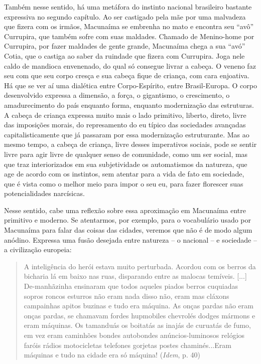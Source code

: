 Também nesse sentido, há uma metáfora do instinto nacional brasileiro
bastante expressiva no segundo capítulo. Ao ser castigado pela mãe por
uma malvadeza que fizera com os irmãos, Macunaíma se embrenha no mato e
encontra seu ``avô'' Currupira, que também sofre com suas maldades.
Chamado de Menino-home por Currupira, por fazer maldades de gente
grande, Macunaíma chega a sua ``avó'' Cotia, que o castiga ao saber da
ruindade que fizera com Currupira. Joga nele caldo de mandioca
envenenado, do qual só consegue livrar a cabeça. O veneno faz seu com
que seu corpo cresça e sua cabeça fique de criança, com cara enjoativa.
Há que se ver aí uma dialética entre Corpo-Espírito, entre
Brasil-Europa. O corpo desenvolvido expressa a dimensão, a força, o
gigantismo, o crescimento, o amadurecimento do país enquanto forma,
enquanto modernização das estruturas. A cabeça de criança expressa muito
mais o lado primitivo, liberto, direto, livre das imposições morais, do
represamento do eu típico das sociedades avançadas capitalisticamente
que já passaram por essa modernização estruturante. Mas ao mesmo tempo,
a cabeça de criança, livre desses imperativos sociais, pode se sentir
livre para agir livre de qualquer senso de comunidade, como um ser
social, mas que traz interiorizados em sua subjetividade os automatismos
da natureza, que age de acordo com os instintos, sem atentar para a vida
de fato em sociedade, que é vista como o melhor meio para impor o seu
eu, para fazer florescer suas potencialidades narcísicas.

Nesse sentido, cabe uma reflexão sobre essa aproximação em Macunaíma
entre primitivo e moderno. Se atentarmos, por exemplo, para o
vocabulário usado por Macunaíma para falar das coisas das cidades,
veremos que não é de modo algum anódino. Expressa uma fusão desejada
entre natureza -- o nacional -- e sociedade -- a civilização europeia:

\begin{quote}
A inteligência do herói estava muito perturbada. Acordou com os berros
da bicharia lá em baixo nas ruas, disparando entre as malocas temíveis.
{[}...{]} De-manhãzinha ensinaram que todos aqueles piados berros
cuquiadas sopros roncos esturros não eram nada disso não, eram mas
cláxons campainhas apitos buzinas e tudo era máquina. As onças pardas
não eram onças pardas, se chamavam fordes hupmobiles chevrolés dodges
mármons e eram máquinas. Os tamanduás os boitatás as inajás de curuatás
de fumo, em vez eram caminhões bondes autobondes anúncios-luminosos
relógios faróis rádios motocicletas telefones gorjetas postes
chaminés...Eram máquinas e tudo na cidade era só máquina! (\emph{Idem},
p. 40)
\end{quote}

